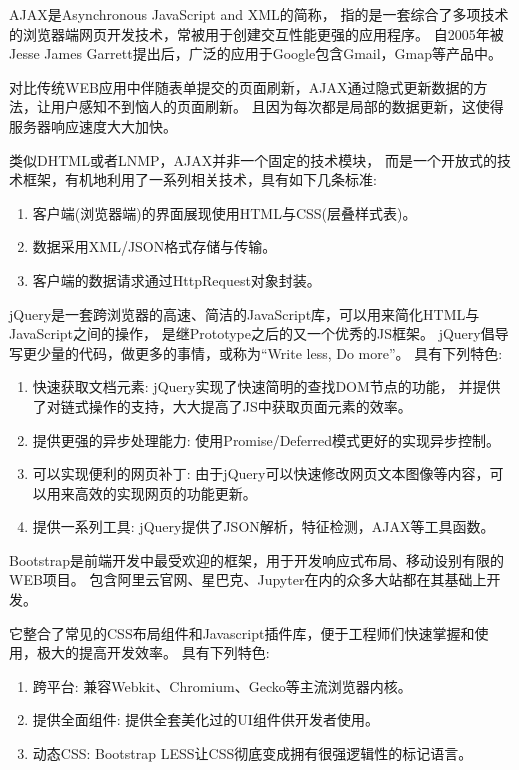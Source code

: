 \documentclass{morningstar}
\begin{document}

AJAX是Asynchronous JavaScript and XML的简称，
指的是一套综合了多项技术的浏览器端网页开发技术，常被用于创建交互性能更强的应用程序。\cite{ajax3}
自2005年被Jesse James Garrett提出后，广泛的应用于Google包含Gmail，Gmap等产品中。

对比传统WEB应用中伴随表单提交的页面刷新，AJAX通过隐式更新数据的方法，让用户感知不到恼人的页面刷新。
且因为每次都是局部的数据更新，这使得服务器响应速度大大加快。

类似DHTML或者LNMP，AJAX并非一个固定的技术模块，\cite{ajax2}
而是一个开放式的技术框架，有机地利用了一系列相关技术，具有如下几条标准: 
\begin{enumerate}
\item 客户端(浏览器端)的界面展现使用HTML与CSS(层叠样式表)。
\item 数据采用XML/JSON格式存储与传输。
\item 客户端的数据请求通过HttpRequest对象封装。
\end{enumerate}



jQuery是一套跨浏览器的高速、简洁的JavaScript库，可以用来简化HTML与JavaScript之间的操作，
是继Prototype之后的又一个优秀的JS框架。
jQuery倡导写更少量的代码，做更多的事情，或称为“Write less, Do more”。
具有下列特色: 
\begin{enumerate}
    \item 快速获取文档元素: jQuery实现了快速简明的查找DOM节点的功能，
    并提供了对链式操作的支持，大大提高了JS中获取页面元素的效率。
    \item 提供更强的异步处理能力: 使用Promise/Deferred模式更好的实现异步控制。
    \item 可以实现便利的网页补丁: 由于jQuery可以快速修改网页文本图像等内容，可以用来高效的实现网页的功能更新。
    \item 提供一系列工具: jQuery提供了JSON解析，特征检测，AJAX等工具函数。
\end{enumerate}


Bootstrap是前端开发中最受欢迎的框架，用于开发响应式布局、移动设别有限的WEB项目。
包含阿里云官网、星巴克、Jupyter在内的众多大站都在其基础上开发。

它整合了常见的CSS布局组件和Javascript插件库，便于工程师们快速掌握和使用，极大的提高开发效率。
具有下列特色: 
\begin{enumerate}
\item 跨平台: 兼容Webkit、Chromium、Gecko等主流浏览器内核。
\item 提供全面组件: 提供全套美化过的UI组件供开发者使用。
\item 动态CSS: Bootstrap LESS让CSS彻底变成拥有很强逻辑性的标记语言。\cite{bootstrap1}
\end{enumerate}
\end{document}

